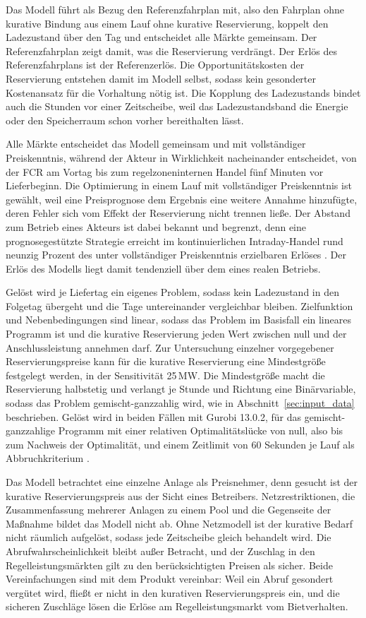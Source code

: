 Das Modell führt als Bezug den Referenzfahrplan mit, also den Fahrplan ohne kurative Bindung aus einem Lauf ohne kurative Reservierung, koppelt den Ladezustand über den Tag und entscheidet alle Märkte gemeinsam.
Der Referenzfahrplan zeigt damit, was die Reservierung verdrängt.
Der Erlös des Referenzfahrplans ist der Referenzerlös.
Die Opportunitätskosten der Reservierung entstehen damit im Modell selbst, sodass kein gesonderter Kostenansatz für die Vorhaltung nötig ist.
Die Kopplung des Ladezustands bindet auch die Stunden vor einer Zeitscheibe, weil das Ladezustandsband die Energie oder den Speicherraum schon vorher bereithalten lässt.

Alle Märkte entscheidet das Modell gemeinsam und mit vollständiger Preiskenntnis, während der Akteur in Wirklichkeit nacheinander entscheidet, von der \ac{FCR} am Vortag bis zum regelzoneninternen Handel fünf Minuten vor Lieferbeginn.
Die Optimierung in einem Lauf mit vollständiger Preiskenntnis ist gewählt, weil eine Preisprognose dem Ergebnis eine weitere Annahme hinzufügte, deren Fehler sich vom Effekt der Reservierung nicht trennen ließe.
Der Abstand zum Betrieb eines Akteurs ist dabei bekannt und begrenzt, denn eine prognosegestützte Strategie erreicht im kontinuierlichen Intraday-Handel rund neunzig Prozent des unter vollständiger Preiskenntnis erzielbaren Erlöses \cite{hornek_value_2025}.
Der Erlös des Modells liegt damit tendenziell über dem eines realen Betriebs.

Gelöst wird je Liefertag ein eigenes Problem, sodass kein Ladezustand in den Folgetag übergeht und die Tage untereinander vergleichbar bleiben.
Zielfunktion und Nebenbedingungen sind linear, sodass das Problem im Basisfall ein lineares Programm ist und die kurative Reservierung jeden Wert zwischen null und der Anschlussleistung annehmen darf.
Zur Untersuchung einzelner vorgegebener Reservierungspreise kann für die kurative Reservierung eine Mindestgröße festgelegt werden, in der Sensitivität 25\,\si{MW}.
Die Mindestgröße macht die Reservierung halbstetig und verlangt je Stunde und Richtung eine Binärvariable, sodass das Problem gemischt-ganzzahlig wird, wie in Abschnitt~\ref{sec:input_data} beschrieben.
Gelöst wird in beiden Fällen mit Gurobi 13.0.2, für das gemischt-ganzzahlige Programm mit einer relativen Optimalitätslücke von null, also bis zum Nachweis der Optimalität, und einem Zeitlimit von 60 Sekunden je Lauf als Abbruchkriterium \cite{gurobi_reference_2026}.

Das Modell betrachtet eine einzelne Anlage als Preisnehmer, denn gesucht ist der kurative Reservierungspreis aus der Sicht eines Betreibers.
Netzrestriktionen, die Zusammenfassung mehrerer Anlagen zu einem Pool und die Gegenseite der Maßnahme bildet das Modell nicht ab.
Ohne Netzmodell ist der kurative Bedarf nicht räumlich aufgelöst, sodass jede Zeitscheibe gleich behandelt wird.
Die Abrufwahrscheinlichkeit bleibt außer Betracht, und der Zuschlag in den Regelleistungsmärkten gilt zu den berücksichtigten Preisen als sicher.
Beide Vereinfachungen sind mit dem Produkt vereinbar: Weil ein Abruf gesondert vergütet wird, fließt er nicht in den kurativen Reservierungspreis ein, und die sicheren Zuschläge lösen die Erlöse am Regelleistungsmarkt vom Bietverhalten.

